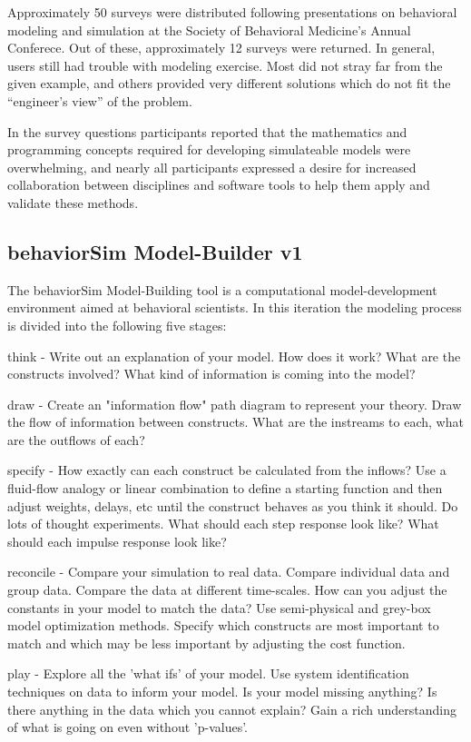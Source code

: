 \documentclass[conference]{IEEEtran}
\begin{document}
Approximately 50 surveys were distributed following presentations on behavioral modeling and simulation at the Society of Behavioral Medicine's Annual Conferece. 
Out of these, approximately 12 surveys were returned.
In general, users still had trouble with modeling exercise.
Most did not stray far from the given example, and others provided very different solutions which do not fit the ``engineer's view'' of the problem.

In the survey questions participants reported that the mathematics and programming concepts required for developing simulateable models were overwhelming, and nearly all participants expressed a desire for increased collaboration between disciplines and software tools to help them apply and validate these methods.
  
\subsection{behaviorSim Model-Builder v1}
The behaviorSim Model-Building tool is a computational model-development environment aimed at behavioral scientists.
In this iteration the modeling process is divided into the following five stages:

think - 
Write out an explanation of your model. 
How does it work? 
What are the constructs involved? 
What kind of information is coming into the model?

draw - 
Create an "information flow" path diagram to represent your theory. 
Draw the flow of information between constructs. 
What are the instreams to each, what are the outflows of each?

specify - 
How exactly can each construct be calculated from the inflows? 
Use a fluid-flow analogy or linear combination to define a starting function and then adjust weights, delays, etc until the construct behaves as you think it should. 
Do lots of thought experiments. 
What should each step response look like? 
What should each impulse response look like?

reconcile - 
Compare your simulation to real data. 
Compare individual data and group data. 
Compare the data at different time-scales. 
How can you adjust the constants in your model to match the data? 
Use semi-physical and grey-box model optimization methods. 
Specify which constructs are most important to match and which may be less important by adjusting the cost function.

play - 
Explore all the 'what ifs' of your model. 
Use system identification techniques on data to inform your model. 
Is your model missing anything? 
Is there anything in the data which you cannot explain? 
Gain a rich understanding of what is going on even without 'p-values'.
\end{document}

